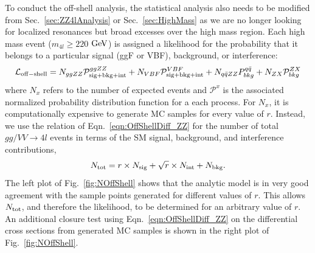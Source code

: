 To conduct the off-shell analysis, the statistical analysis also needs to be modified from Sec.~\ref{sec:ZZ4lAnalysis} or Sec.~\ref{sec:HighMass} as we are no longer looking for localized resonances but broad excesses over the high mass region. Each high mass event ($m_{4l}\geq220$ $\rm{GeV}$) is assigned a likelihood for the probability that it belongs to a particular signal (ggF or VBF), background, or interference:
\begin{equation}
\mathcal{L}_{\rm off-shell} = N_{ggZZ}\mathcal{P}_{\rm sig+bkg+int}^{ggZZ} + N_{VBF}\mathcal{P}_{\rm sig+bkg+int}^{VBF} + N_{q\bar{q}ZZ}P_{bkg}^{q\bar{q}} + N_{ZX}\mathcal{P}_{bkg}^{ZX}
\label{eqn:GenOffShellLikelihood}
\end{equation}
where $N_{x}$ refers to the number of expected events and $\mathcal{P}^{x}$ is the associated normalized probability distribution function for a each process. For $N_{x}$, it is computationally expensive to generate MC samples for every value of $r$. Instead, we use the relation of Eqn.~\ref{eqn:OffShellDiff_ZZ} for the number of total $gg/VV \rightarrow 4l$ events in terms of the SM signal, background, and interference contributions,
\begin{equation}
N_{\rm tot} = r \times N_{\rm sig} + \sqrt{r}\times N_{\rm int} + N_{\rm bkg}. 
\label{eqn:NOffShell}
\end{equation}
The left plot of Fig.~\ref{fig:NOffShell} shows that the analytic model is in very good agreement with the sample points generated for different values of $r$. This allows $N_{\rm tot}$, and therefore the likelihood, to be determined for an arbitrary value of $r$. An additional closure test using Eqn.~\ref{eqn:OffShellDiff_ZZ} on the differential cross sections from generated MC samples is shown in the right plot of Fig.~\ref{fig:NOffShell}.

